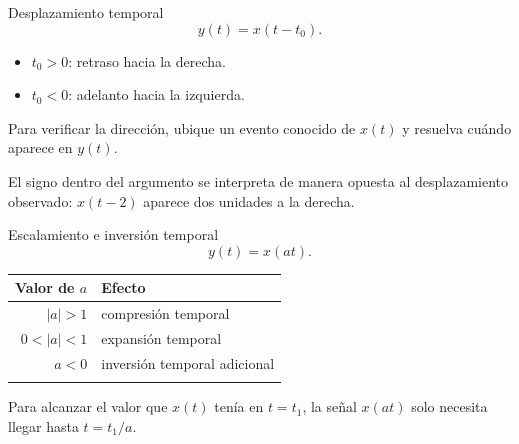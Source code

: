 \documentclass[
  ignorenonframetext,
  aspectratio=169,
  spanish,
  professionalfonts]{beamer}
\newcounter{none} %
\providecommand{\tightlist}{%
  \setlength{\itemsep}{0pt}\setlength{\parskip}{0pt}}
\begin{document}
\begin{frame}{Desplazamiento temporal}
\protect{}\label{desplazamiento-temporal}
\[y(t)=x(t-t_0).\]

\begin{itemize}
\tightlist
\item
  \(t_0>0\): retraso hacia la derecha.
\item
  \(t_0<0\): adelanto hacia la izquierda.
\end{itemize}

Para verificar la dirección, ubique un evento conocido de \(x(t)\) y
resuelva cuándo aparece en \(y(t)\).

\begin{tcolorbox}[enhanced jigsaw, arc=.35mm, bottomrule=.15mm, bottomtitle=1mm, breakable, colback=white, colbacktitle=quarto-callout-warning-color!10!white, colframe=quarto-callout-warning-color-frame, coltitle=black, left=2mm, leftrule=.75mm, opacityback=0, opacitybacktitle=0.6, rightrule=.15mm, title={Error frecuente}, titlerule=0mm, toprule=.15mm, toptitle=1mm]

El signo dentro del argumento se interpreta de manera opuesta al
desplazamiento observado: \(x(t-2)\) aparece dos unidades a la derecha.

\end{tcolorbox}
\end{frame}

\begin{frame}{Escalamiento e inversión temporal}
\protect{}\label{escalamiento-e-inversiuxf3n-temporal}
\[y(t)=x(at).\]

{\def\LTcaptype{none} %
\begin{longtable}[]{@{}rl@{}}
\toprule\noalign{}
Valor de \(a\) & Efecto \\
\midrule\noalign{}
\endhead
\(|a|>1\) & compresión temporal \\
\(0<|a|<1\) & expansión temporal \\
\(a<0\) & inversión temporal adicional \\
\bottomrule\noalign{}
\end{longtable}
}

\begin{tcolorbox}[enhanced jigsaw, arc=.35mm, bottomrule=.15mm, bottomtitle=1mm, breakable, colback=white, colbacktitle=quarto-callout-note-color!10!white, colframe=quarto-callout-note-color-frame, coltitle=black, left=2mm, leftrule=.75mm, opacityback=0, opacitybacktitle=0.6, rightrule=.15mm, title={Razón}, titlerule=0mm, toprule=.15mm, toptitle=1mm]

Para alcanzar el valor que \(x(t)\) tenía en \(t=t_1\), la señal
\(x(at)\) solo necesita llegar hasta \(t=t_1/a\).

\end{tcolorbox}
\end{frame}
\end{document}
